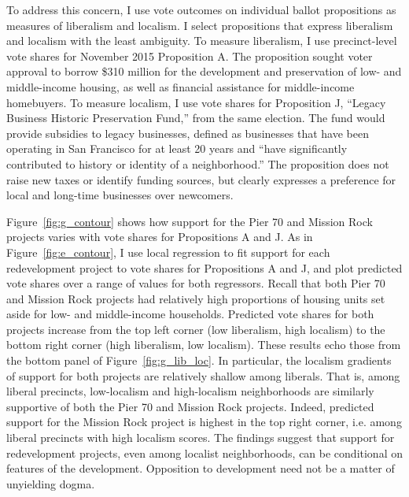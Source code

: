 \documentclass[article,11pt]{memoir}
\begin{document}
To address this concern, I use vote outcomes on individual ballot propositions as measures of liberalism and localism.  I select propositions that express liberalism and localism with the least ambiguity.  To measure liberalism, I use precinct-level vote shares for November 2015 Proposition A. The proposition sought voter approval to borrow \$310 million for the development and preservation of low- and middle-income housing, as well as financial assistance for middle-income homebuyers. To measure localism, I use vote shares for Proposition J, ``Legacy Business Historic Preservation Fund,'' from the same election.  The fund would provide subsidies to legacy businesses, defined as businesses that have been operating in San Francisco for at least 20 years and ``have significantly contributed to history or identity of a neighborhood.''  The proposition does not raise new taxes or identify funding sources, but clearly expresses a preference for local and long-time businesses over newcomers.

Figure~\ref{fig:g_contour} shows how support for the Pier 70 and Mission Rock projects varies with vote shares for Propositions A and J.  As in Figure~\ref{fig:e_contour}, I use local regression to fit support for each redevelopment project to vote shares for Propositions A and J, and plot predicted vote shares over a range of values for both regressors.  Recall that both Pier 70 and Mission Rock projects had relatively high proportions of housing units set aside for low- and middle-income households.  Predicted vote shares for both projects increase from the top left corner (low liberalism, high localism) to the bottom right corner (high liberalism, low localism).  These results echo those from the bottom panel of Figure~\ref{fig:g_lib_loc}.  In particular, the localism gradients of support for both projects are relatively shallow among liberals. That is, among liberal precincts, low-localism and high-localism neighborhoods are similarly supportive of both the Pier 70 and Mission Rock projects.  Indeed, predicted support for the Mission Rock project is highest in the top right corner, i.e. among liberal precincts with high localism scores.  The findings suggest that support for redevelopment projects, even among localist neighborhoods, can be conditional on features of the development.  Opposition to development need not be a matter of unyielding dogma.
\end{document}
